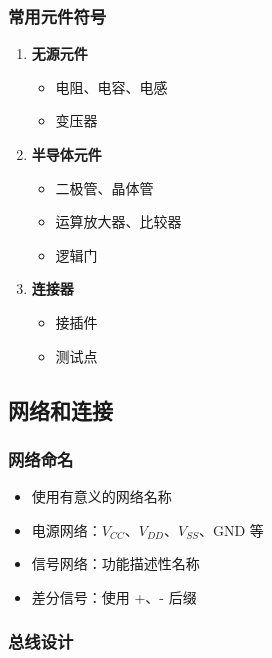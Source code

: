 \subsubsection{常用元件符号}

\begin{enumerate}
  \item \textbf{无源元件}
    \begin{itemize}
      \item 电阻、电容、电感
      \item 变压器
    \end{itemize}

  \item \textbf{半导体元件}
    \begin{itemize}
      \item 二极管、晶体管
      \item 运算放大器、比较器
      \item 逻辑门
    \end{itemize}

  \item \textbf{连接器}
    \begin{itemize}
      \item 接插件
      \item 测试点
    \end{itemize}
\end{enumerate}

\subsection{网络和连接}

\subsubsection{网络命名}

\begin{itemize}
  \item 使用有意义的网络名称
  \item 电源网络：$V_{CC}$、$V_{DD}$、$V_{SS}$、GND 等
  \item 信号网络：功能描述性名称
  \item 差分信号：使用 +、- 后缀
\end{itemize}

\subsubsection{总线设计}

